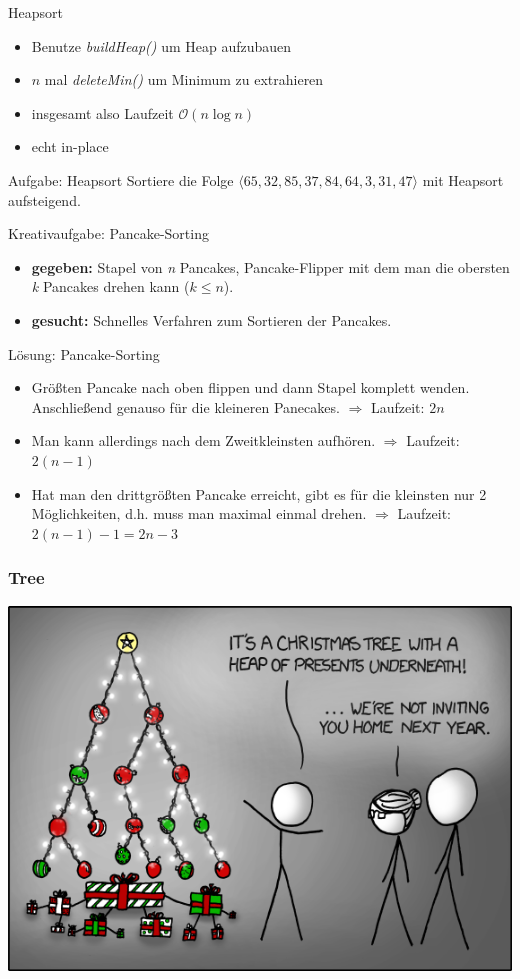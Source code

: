 \begin{frame}{Heapsort}
	\begin{itemize}
		\item Benutze \emph{buildHeap()} um Heap aufzubauen
		\item $n$ mal \emph{deleteMin()} um Minimum zu extrahieren
		\item insgesamt also Laufzeit $\mathcal{O}(n \log{n})$
		\item echt in-place
	\end{itemize}
\end{frame}

\begin{frame}{Aufgabe: Heapsort}
	Sortiere die Folge $\langle 65, 32, 85, 37, 84, 64, 3, 31, 47 \rangle$ mit Heapsort aufsteigend.
\end{frame}

\begin{frame}{Kreativaufgabe: Pancake-Sorting}
	\begin{itemize}
		\item \textbf{gegeben:} Stapel von \emph{n} Pancakes, Pancake-Flipper mit dem man die obersten \emph{k} Pancakes drehen kann ($ k \leq n $).
		\item \textbf{gesucht:} Schnelles Verfahren zum Sortieren der Pancakes.
	\end{itemize}
\end{frame}

\begin{frame}{Lösung: Pancake-Sorting}
	\begin{itemize}
		\item Größten Pancake nach oben flippen und dann Stapel komplett wenden. Anschließend genauso für die kleineren Panecakes.  $ \Rightarrow $ Laufzeit: $2n$
		\item Man kann allerdings nach dem Zweitkleinsten aufhören. $ \Rightarrow $ Laufzeit: $2(n - 1)$
		\item Hat man den drittgrößten Pancake erreicht, gibt es für die kleinsten nur 2 Möglichkeiten, d.h. muss man maximal einmal drehen. $ \Rightarrow $ Laufzeit: $2(n-1) - 1 = 2n - 3$
	\end{itemize}

\end{frame}

\begin{frame}
	\frametitle{Tree}
	\begin{center}
		\includegraphics[width=\textwidth,height=\textheight,keepaspectratio]{images/tree}
	\end{center}
\end{frame}


